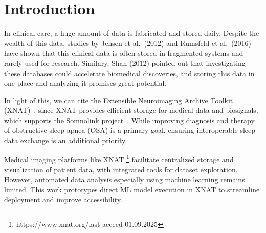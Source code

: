 

\section{Introduction}

In clinical care, a huge amount of data is fabricated and stored daily. Despite the wealth of this data, studies by Jensen et al.~(2012) and Rumsfeld et al.~(2016) have shown that this clinical data is often stored in fragmented systems and rarely used for research. Similary, Shah (2012)\cite{jensen_mining_2012,rumsfeld_big_2016,shah_coming_2012} pointed out that investigating these databases could accelerate biomedical discoveries, and storing this data in one place and analyzing it promises great potential.

In light of this, we can cite the Extensible Neuroimaging Archive Toolkit (XNAT)~\cite{marcus_extensible_2007}, since XNAT provides efficient storage for medical data and biosignals, which supports the Somnolink project~\cite{internetredaktion_somnolink_nodate}. While improving diagnosis and therapy of obstructive sleep apnea (OSA) is a primary goal, ensuring interoperable sleep data exchange is an additional priority.

Medical imaging platforms like XNAT \footnote{https://www.xnat.org/{last acceed 01.09.2025}} facilitate centralized storage and visualization of patient data, with integrated tools for dataset exploration. However, automated data analysis especially using machine learning remains limited. This work prototypes direct ML model execution in XNAT to streamline deployment and improve accessibility.

























 

